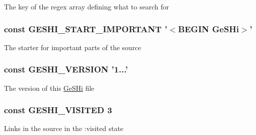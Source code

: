 The key of the regex array defining what to search for \hypertarget{geshi_8php_ae681952f8490031cff157153f965cbaf}{
\subsubsection[{G\-E\-S\-H\-I\-\_\-\-S\-T\-A\-R\-T\-\_\-\-I\-M\-P\-O\-R\-T\-A\-N\-T}]{\setlength{\rightskip}{0pt plus 5cm}const G\-E\-S\-H\-I\-\_\-\-S\-T\-A\-R\-T\-\_\-\-I\-M\-P\-O\-R\-T\-A\-N\-T '$<$B\-E\-G\-I\-N {\bf Ge\-S\-Hi}$>$'}}\label{geshi_8php_ae681952f8490031cff157153f965cbaf}
The starter for important parts of the source \hypertarget{geshi_8php_ad1ea05c1a2b4ad5c5f0f45d4e4a63366}{
\subsubsection[{G\-E\-S\-H\-I\-\_\-\-V\-E\-R\-S\-I\-O\-N}]{\setlength{\rightskip}{0pt plus 5cm}const G\-E\-S\-H\-I\-\_\-\-V\-E\-R\-S\-I\-O\-N '1...'}}\label{geshi_8php_ad1ea05c1a2b4ad5c5f0f45d4e4a63366}
The version of this \hyperlink{class_ge_s_hi}{Ge\-S\-Hi} file \hypertarget{geshi_8php_a1e565db022fc06a7a9dac10bc247a309}{
\subsubsection[{G\-E\-S\-H\-I\-\_\-\-V\-I\-S\-I\-T\-E\-D}]{\setlength{\rightskip}{0pt plus 5cm}const G\-E\-S\-H\-I\-\_\-\-V\-I\-S\-I\-T\-E\-D 3}}\label{geshi_8php_a1e565db022fc06a7a9dac10bc247a309}
Links in the source in the \-:visited state 